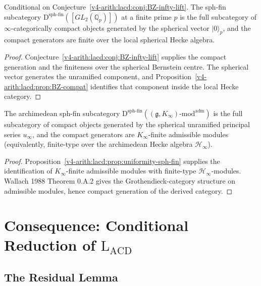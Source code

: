 \begin{proposition}
\label{v4-arith:lacd:prop:uniformity-finite}
Conditional on
Conjecture~\ref{v4-arith:lacd:conj:BZ-infty-lift}. The sph-fin subcategory
\(\mathrm{D}^{\mathrm{sph\text{-}fin}}([GL_{2}(\mathbb{Q}_{p})])\) at a
finite prime \(p\) is the full subcategory of \(\infty\)-categorically
compact objects generated by the spherical vector
\(|0\rangle_{p}\), and the compact generators are finite over the
local spherical Hecke algebra.
\end{proposition}

\begin{proof}
Conjecture~\ref{v4-arith:lacd:conj:BZ-infty-lift} supplies the compact
generation and the finiteness over the spherical Bernstein centre. The
spherical vector generates the unramified component, and
Proposition~\ref{v4-arith:lacd:prop:BZ-compat} identifies that component inside
the local Hecke category.
\end{proof}

\begin{proposition}
\label{v4-arith:lacd:prop:uniformity-infinity}
The archimedean sph-fin subcategory
\(\mathrm{D}^{\mathrm{sph\text{-}fin}}((\mathfrak{g}, K_{\infty})\text{-mod}^{\mathrm{adm}})\)
is the full subcategory of compact objects generated by the
spherical unramified principal series \(u_{\infty}\), and the compact
generators are \(K_{\infty}\)-finite admissible modules (equivalently,
finite-type over the archimedean Hecke algebra \(\mathcal{H}_{\infty}\)).
\end{proposition}

\begin{proof}
Proposition~\ref{v4-arith:lacd:prop:uniformity-sph-fin} supplies the
identification of \(K_{\infty}\)-finite admissible modules with
finite-type \(\mathcal{H}_{\infty}\)-modules. Wallach 1988 Theorem
0.A.2 gives the Grothendieck-category structure on admissible
modules, hence compact generation of the derived category.
\end{proof}

\section{Consequence: Conditional Reduction of \(\mathrm{L}_{\mathrm{ACD}}\)}
\label{v4-arith:lacd:consequence}

\subsection{The Residual Lemma}

